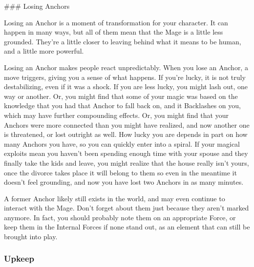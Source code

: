 \documentclass[
  oneside,
  statementpaper,
  9pt]{memoir}
\begin{document}
\begin{Player}
### Losing Anchors

Losing an Anchor is a moment of transformation for your character. It can happen in many ways, but all of them mean that the Mage is a little less grounded. They’re a little closer to leaving behind what it means to be human, and a little more powerful.

Losing an Anchor makes people react unpredictably. When you lose an Anchor, a move triggers, giving you a sense of what happens. If you’re lucky, it is not truly destabilizing, even if it was a shock. If you are less lucky, you might lash out, one way or another. Or, you might find that some of your magic was based on the knowledge that you had that Anchor to fall back on, and it Backlashes on you, which may have further compounding effects. Or, you might find that your Anchors were more connected than you might have realized, and now another one is threatened, or lost outright as well. How lucky you are depends in part on how many Anchors you have, so you can quickly enter into a spiral. If your magical exploits mean you haven’t been spending enough time with your spouse and they finally take the kids and leave, you might realize that the house really isn’t yours, once the divorce takes place it will belong to them so even in the meantime it doesn’t feel grounding, and now you have lost two Anchors in as many minutes.

\end{Player}

\begin{MC}

A former Anchor likely still exists in the world, and may even continue to interact with the Mage. Don’t forget about them just because they aren’t marked anymore. In fact, you should probably note them on an appropriate Force, or keep them in the Internal Forces if none stand out, as an element that can still be brought into play.

\end{MC}

\hypertarget{upkeep}{%
\subsubsection{Upkeep}\label{upkeep}}
\end{document}
